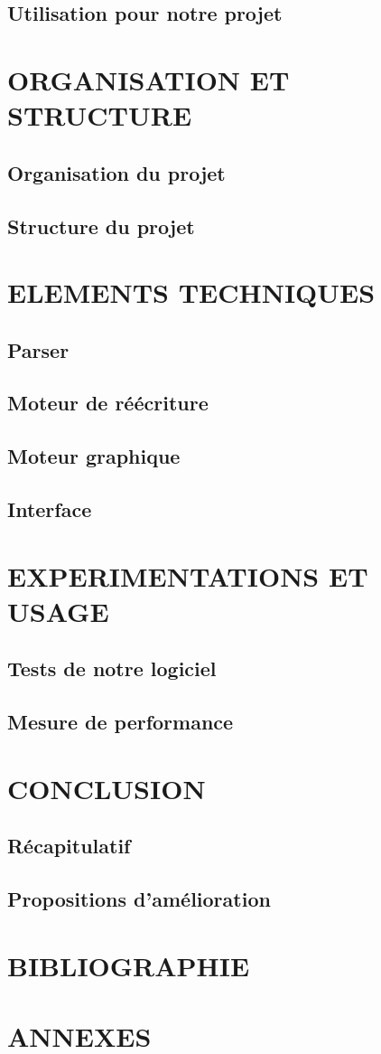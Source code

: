 \documentclass[12pt]{report}
\begin{document}
\section{Utilisation pour notre projet}

\chapter{ORGANISATION ET STRUCTURE}
\section{Organisation du projet}
\section{Structure du projet}

\chapter{ELEMENTS TECHNIQUES}
\section{Parser}
\section{Moteur de réécriture}
\section{Moteur graphique}
\section{Interface}

\chapter{EXPERIMENTATIONS ET USAGE}
\section{Tests de notre logiciel}
\section{Mesure de performance}

\chapter{CONCLUSION}
\section{Récapitulatif}
\section{Propositions d'amélioration}

\chapter{BIBLIOGRAPHIE}

\chapter{ANNEXES}
\end{document}
